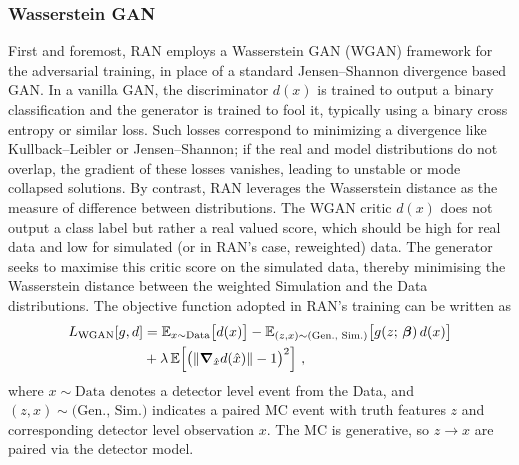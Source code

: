 {{        \subsubsection{Wasserstein GAN}
            First and foremost, RAN employs a {Wasserstein GAN (WGAN)} framework for the adversarial training, in place of a standard Jensen--Shannon divergence based GAN.
            In a vanilla GAN, the discriminator $d(x)$ is trained to output a binary classification and the generator is trained to fool it, typically using a binary cross entropy or similar loss.
            Such losses correspond to minimizing a divergence like Kullback--Leibler or Jensen--Shannon; if the real and model distributions do not overlap, the gradient of these losses vanishes, leading to unstable or mode collapsed solutions.
            By contrast, RAN leverages the Wasserstein distance as the measure of difference between distributions.
            The WGAN critic $d(x)$ does not output a class label but rather a real valued score, which should be high for real data and low for simulated (or in RAN's case, reweighted) data.
            The generator seeks to maximise this critic score on the simulated data, thereby minimising the Wasserstein distance between the weighted Simulation and the Data distributions.
            The objective function adopted in RAN’s training can be written as
            \begin{align}
                \label{eq:ran_wgan_loss}
                L_{\text{WGAN}}[g,d] &= \mathbb{E}_{x\sim \text{Data}}\big[d(x)\big] - \mathbb{E}_{(z,x)\sim \text{(Gen., Sim.)}}\big[g(z;\,\vb*\beta)\,d(x)\big]\\
                \nonumber&+ \lambda\,\mathbb{E}\Big[\big(\norm{\grad_{\hat{x}}d(\hat{x})} - 1\big)^2\Big]~,
            \end{align}
            where $x\sim\text{Data}$ denotes a detector level event from the Data, and $(z,x)\sim\text{(Gen., Sim.)}$ indicates a paired MC event with truth features $z$ and corresponding detector level observation $x$.
            The MC is generative, so $z\to x$ are paired via the detector model.
            
}}
